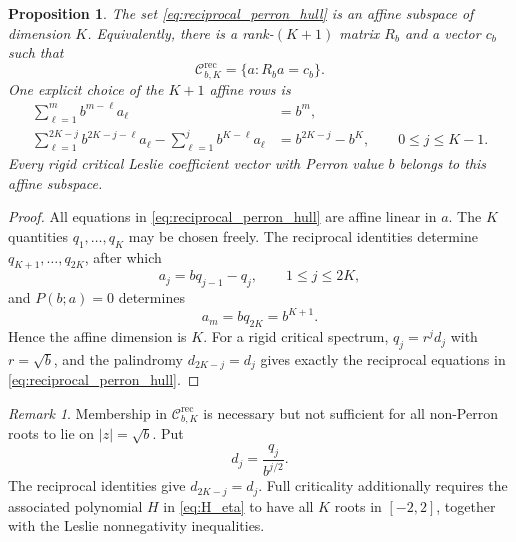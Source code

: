 \documentclass[11pt]{amsart}
\numberwithin{equation}{section}
\theoremstyle{plain}
\newtheorem{proposition}[theorem]{Proposition}
\theoremstyle{definition}
\theoremstyle{remark}
\newtheorem{remark}[theorem]{Remark}
\begin{document}
\begin{proposition}
\label{prop:reciprocal_affine_dimension}
The set \eqref{eq:reciprocal_perron_hull} is an affine subspace of dimension $K$.  Equivalently, there is a rank-$(K+1)$ matrix $R_b$ and a vector $c_b$ such that
\begin{equation}
\mathcal C^{\mathrm{rec}}_{b,K}
=\{a:R_ba=c_b\}.
\label{eq:Rb_affine_form}
\end{equation}
One explicit choice of the $K+1$ affine rows is
\begin{align}
\sum_{\ell=1}^{m}b^{m-\ell}a_\ell
&=b^m,
\label{eq:Rb_perron_row}\\
\sum_{\ell=1}^{2K-j}b^{2K-j-\ell}a_\ell
-
\sum_{\ell=1}^{j}b^{K-\ell}a_\ell
&=b^{2K-j}-b^K,
\qquad 0\leq j\leq K-1.
\label{eq:Rb_reciprocal_rows}
\end{align}
Every rigid critical Leslie coefficient vector with Perron value $b$ belongs to this affine subspace.
\end{proposition}

\begin{proof}
All equations in \eqref{eq:reciprocal_perron_hull} are affine linear in $a$.  The $K$ quantities $q_1,\ldots,q_K$ may be chosen freely.  The reciprocal identities determine $q_{K+1},\ldots,q_{2K}$, after which
\begin{equation}
a_j=bq_{j-1}-q_j,
\qquad 1\leq j\leq2K,
\label{eq:a_from_q}
\end{equation}
and $P(b;a)=0$ determines
\begin{equation}
a_m=bq_{2K}=b^{K+1}.
\label{eq:a_m_from_q}
\end{equation}
Hence the affine dimension is $K$.  For a rigid critical spectrum, $q_j=r^jd_j$ with $r=\sqrt b$, and the palindromy $d_{2K-j}=d_j$ gives exactly the reciprocal equations in \eqref{eq:reciprocal_perron_hull}.
\end{proof}

\begin{remark}
\label{rem:reciprocal_not_full_critical}
Membership in $\mathcal C^{\mathrm{rec}}_{b,K}$ is necessary but not sufficient for all non-Perron roots to lie on $|z|=\sqrt b$.  Put
\begin{equation}
d_j=\frac{q_j}{b^{j/2}}.
\label{eq:d_from_q}
\end{equation}
The reciprocal identities give $d_{2K-j}=d_j$.  Full criticality additionally requires the associated polynomial $H$ in \eqref{eq:H_eta} to have all $K$ roots in $[-2,2]$, together with the Leslie nonnegativity inequalities.
\end{remark}
\end{document}
